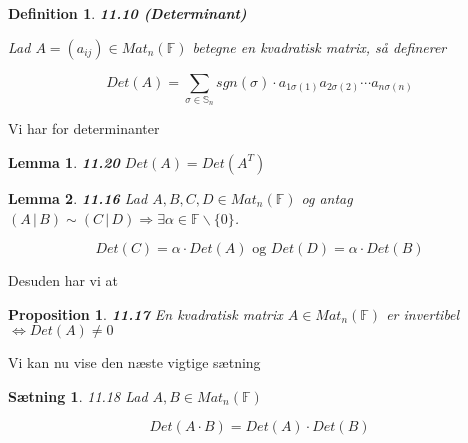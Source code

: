 \documentclass[paper=a4, fontsize=11pt]{scrartcl} %
\newtheorem*{theorem}{Sætning}
\newtheorem*{lemma}{Lemma}
\newtheorem*{definition}{Definition}
\newtheorem*{proposition}{Proposition}
\newenvironment{cstmproposition}[1]{\begin{proposition} {\normalfont\textbf{#1}}}{\end{proposition}}
\newenvironment{cstmlemma}[1]{\begin{lemma} {\normalfont\textbf{#1}}}{\end{lemma}}
\newenvironment{cstmdefinition}[1]{\begin{definition} {\normalfont\textbf{#1}}}{\end{definition}}
\begin{document}
			
			\begin{cstmdefinition}{11.10 (Determinant)}
				
				Lad $A=(a_{ij}) \in Mat_n(\mathbb{F})$ betegne en kvadratisk matrix, så definerer
				
				\[Det(A) = \sum_{\sigma \in \mathbb{S}_n} sgn(\sigma) \cdot a_{1\sigma(1)}a_{2\sigma(2)} \cdots a_{n\sigma(n)}\]
				
			\end{cstmdefinition}
			
			Vi har for determinanter 
			
			\begin{cstmlemma}{11.20}
				$Det(A) = Det(A^T)$
			\end{cstmlemma}
			
			
			
			
			\begin{cstmlemma}{11.16}
				Lad $A,B,C,D \in Mat_n(\mathbb{F})$ og antag $(A\,|\,B) \sim (C\,|\,D) \Rightarrow \exists \alpha \in \mathbb{F} \backslash \{0\}$.
				
				\[Det(C) = \alpha \cdot Det(A) \mbox{ og } Det(D) = \alpha \cdot Det(B)\]
				
			\end{cstmlemma}
			
			
			Desuden har vi at 
			
			\begin{cstmproposition}{11.17}
				En kvadratisk matrix $A \in Mat_n(\mathbb{F})$ er invertibel $\Leftrightarrow Det(A) \not = 0$
			\end{cstmproposition}
			
			Vi kan nu vise den næste vigtige sætning
			
			\begin{theorem}{11.18}
				Lad $A,B \in Mat_n(\mathbb{F})$
				
				\[Det(A\cdot B) = Det(A) \cdot Det(B) \tag{11.19}\]
			\end{theorem}
			
\end{document}
